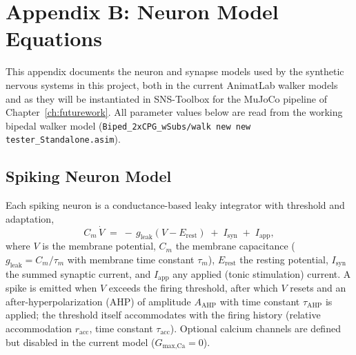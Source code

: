 
\chapter{Appendix B: Neuron Model Equations}\label{app:neuron_equations}

This appendix documents the neuron and synapse models used by the synthetic
nervous systems in this project, both in the current AnimatLab walker models and
as they will be instantiated in SNS-Toolbox for the MuJoCo pipeline of
Chapter~\ref{ch:futurework}. All parameter values below are read from the working
bipedal walker model (\texttt{Biped\_2xCPG\_wSubs/walk new new tester\_Standalone.asim}).

\section{Spiking Neuron Model}

Each spiking neuron is a conductance-based leaky integrator with threshold and
adaptation,
\begin{equation}
    C_{m}\,\dot{V} \;=\; -\,g_{\text{leak}}\left(V - E_{\text{rest}}\right)
                      \;+\; I_{\text{syn}} \;+\; I_{\text{app}},
    \label{eq:app_membrane}
\end{equation}
where $V$ is the membrane potential, $C_{m}$ the membrane capacitance
($g_{\text{leak}} = C_{m}/\tau_{m}$ with membrane time constant $\tau_{m}$),
$E_{\text{rest}}$ the resting potential, $I_{\text{syn}}$ the summed synaptic
current, and $I_{\text{app}}$ any applied (tonic stimulation) current. A spike is
emitted when $V$ exceeds the firing threshold, after which $V$ resets and an
after-hyperpolarization (AHP) of amplitude $A_{\text{AHP}}$ with time constant
$\tau_{\text{AHP}}$ is applied; the threshold itself accommodates with the
firing history (relative accommodation $r_{\text{acc}}$, time constant
$\tau_{\text{acc}}$). Optional calcium channels are defined but disabled in the
current model ($G_{\text{max,Ca}} = 0$).

